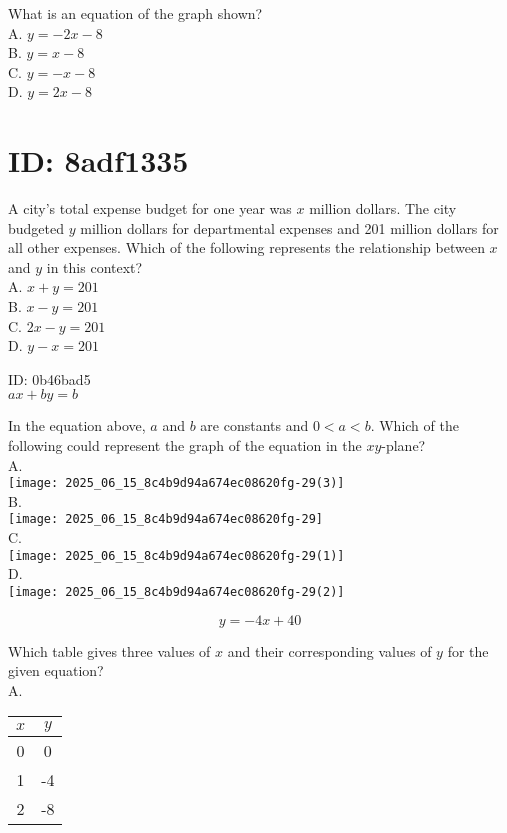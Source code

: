 What is an equation of the graph shown?\\
A. $y=-2 x-8$\\
B. $y=x-8$\\
C. $y=-x-8$\\
D. $y=2 x-8$

\section*{ID: 8adf1335}
A city's total expense budget for one year was $x$ million dollars. The city budgeted $y$ million dollars for departmental expenses and 201 million dollars for all other expenses. Which of the following represents the relationship between $x$ and $y$ in this context?\\
A. $x+y=201$\\
B. $x-y=201$\\
C. $2 x-y=201$\\
D. $y-x=201$

ID: 0b46bad5\\
$a x+b y=b$

In the equation above, $a$ and $b$ are constants and $0<a<b$. Which of the following could represent the graph of the equation in the $x y$-plane?\\
A.\\
\texttt{[image: 2025\_06\_15\_8c4b9d94a674ec08620fg-29(3)]}\\
B.\\
\texttt{[image: 2025\_06\_15\_8c4b9d94a674ec08620fg-29]}\\
C.\\
\texttt{[image: 2025\_06\_15\_8c4b9d94a674ec08620fg-29(1)]}\\
D.\\
\texttt{[image: 2025\_06\_15\_8c4b9d94a674ec08620fg-29(2)]}

$$
y=-4 x+40
$$

Which table gives three values of $x$ and their corresponding values of $y$ for the given equation?\\
A.

\begin{center}
\begin{tabular}{|c|c|}
\hline
$x$ & $y$ \\
\hline
0 & 0 \\
\hline
1 & -4 \\
\hline
2 & -8 \\
\hline
\end{tabular}
\end{center}

